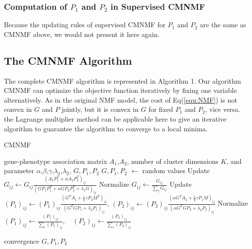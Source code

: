 \documentclass{bmcart}
\begin{document}
\subsubsection*{Computation of $P_1$ and $P_2$ in Supervised CMNMF}
Because the updating rules of supervised CMNMF for $P_1$ and $P_2$ are the same as CMNMF above, we would not present it here again.

\subsection*{The CMNMF Algorithm}
The complete CMNMF algorithm is represented in Algorithm 1. Our algorithm CMNMF can optimize the objective function iteratively by fixing one variable alternatively. As in the original NMF model, the cost of Eq(\ref{equ:NMF}) is not convex in $G$ and $P$ jointly, but it is convex in $G$ for fixed $P_1$ and $P_2$, vice versa. the Lagrange multiplier method can be applicable here to give an iterative algorithm to guarantee the algorithm to converge to a local minima\cite{document_cluster_NMF}.
\begin{algorithm}[t]
\caption{CMNMF}\label{alg:CMNMF}
\renewcommand{\algorithmicrequire}{\textbf{Input:}}
\renewcommand{\algorithmicensure}{\textbf{Output:}}
\label{alg:pf}
\begin{algorithmic}[1]
\REQUIRE gene-phenotype association matrix $A_1$,$A_2$, number of cluster dimensions $K$, and parameter $\alpha$,$\beta$,$\gamma$,$\lambda_1$,$\lambda_2$,
\ENSURE {} ${G}, {P_1},{P_2}$
\STATE ${G},{P_1},{P_2}$ $\leftarrow$ random values
\REPEAT
    \STATE Update $G_{ij}\leftarrow G_{ij}\frac{(A_1P_1^T+\alpha A_2P_2^T)_{ij}}{(GP_1P_1^T+\alpha GP_2P_2^T+\lambda_1G)_{ij}}$
    \STATE Normalize $G_{ij}\leftarrow \frac{G_{ij}}{\sum_{j}G_{ij}}$
    \STATE Update $(P_1)_{ij}\leftarrow (P_1)_{ij}\frac{(G^TA_1+\frac{1}{2}\gamma P_2M^T)_{ij}}{(G^TGP_1+\lambda_2P_1)_{ij}}$,
    $(P_2)_{ij}\leftarrow (P_2)_{ij}\frac{(\alpha G^TA_2+\frac{1}{2}\gamma P_1M)_{ij}}
{(\alpha G^TGP_2 + \lambda_2P_2)_{ij}}$
    \STATE Normalize $(P_1)_{ij}\leftarrow \frac{(P_1)_{ij}}{\sum_{i}(P_1)_{ij}}, \quad
(P_2)_{ij}\leftarrow \frac{(P_2)_{ij}}{\sum_{i}(P_2)_{ij}}$
    
\UNTIL convergence
\RETURN ${G},{P_1},{P_2}$
\end{algorithmic}
\end{algorithm}
\end{document}
